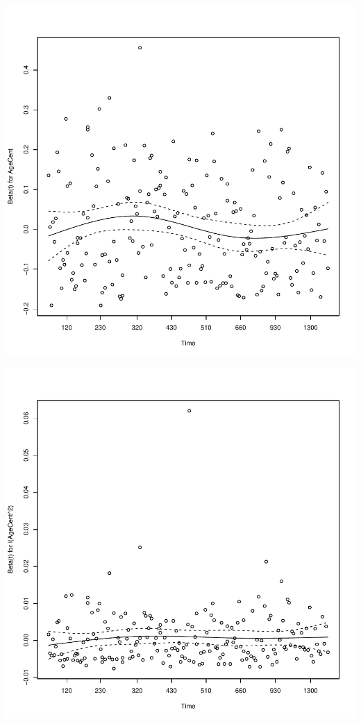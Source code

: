 \documentclass{article}\usepackage[]{graphicx}\usepackage[]{color}
\makeatletter
\def\maxwidth{ %
  \ifdim\Gin@nat@width>\linewidth
    \linewidth
  \else
    \Gin@nat@width
  \fi
}
\newenvironment{knitrout}{}{} %
\makeatother
\begin{document}
\begin{knitrout}
{}




{\centering \includegraphics[width=\maxwidth]{figure/eda-ph-check-full-2} 

}




{\centering \includegraphics[width=\maxwidth]{figure/eda-ph-check-full-3} 

}
\end{knitrout}
\end{document}
